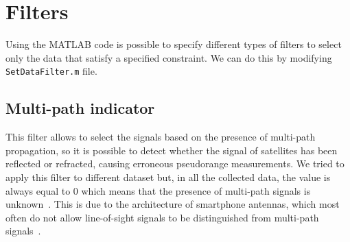 \section{Filters}
\label{sec:filters}
Using the MATLAB code is possible to specify different types of filters to select only the data that satisfy a specified constraint. We can do this by modifying \texttt{SetDataFilter.m} file.

\subsection{Multi-path indicator}
\label{subsec:multipath_indicator}
This filter allows to select the signals based on the presence of multi-path propagation, so it is possible to detect whether the signal of satellites has been reflected or refracted, causing erroneous pseudorange measurements. We tried to apply this filter to different dataset but, in all the collected data, the value is always equal to 0 which means that the presence of multi-path signals is unknown~\cite{GNSS_measurements_API}. This is due to the architecture of smartphone antennas, which most often do not allow line-of-sight signals to be distinguished from multi-path signals~\cite{multipath_article}.

